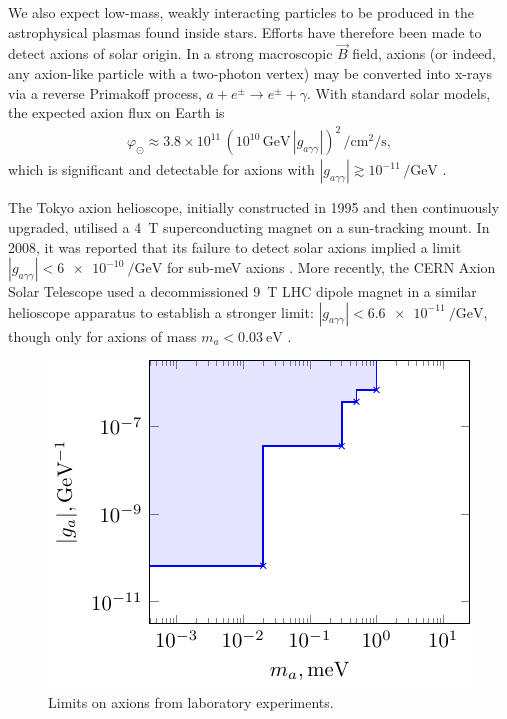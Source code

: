 We also expect low-mass, weakly interacting particles to be produced in the astrophysical plasmas found inside stars.
Efforts have therefore been made to detect axions of solar origin.
In a strong macroscopic $\vec B$ field, axions (or indeed, any axion-like particle with a two-photon vertex) may be converted into x-rays via a reverse Primakoff process, $a + e^\pm \to e^\pm + γ$.
With standard solar models, the expected axion flux on Earth is
\begin{align}
	φ_\odot \approx 3.8\times10^{11}\,(10^{10}\,\si{\giga\eV}\,|g_{aγγ}|)^2\,\si{\per\square\cm\per\s}
,\end{align}
which is significant and detectable for axions with $|g_{aγγ}| \gtrsim 10^{-11}\,\si{\per\giga\eV}$ \cite{solar-axion-flux_2007}.

The Tokyo axion helioscope, initially constructed in 1995 and then continuously upgraded, utilised a \SI{4}{\tesla} superconducting magnet on a sun-tracking mount.
In 2008, it was reported that its failure to detect solar axions implied a limit $|g_{aγγ}| < \SI{6e-10}{\per\giga\eV}$ for sub-\si{\milli\eV} axions \cite{Tokyo-axion-helioscope_2008}.
More recently, the CERN Axion Solar Telescope used a decommissioned \SI{9}{\tesla} LHC dipole magnet in a similar helioscope apparatus to establish a stronger limit: $|g_{aγγ}| < \SI{6.6e-11}{\per\giga\eV}$, though only for axions of mass $m_a < \SI{0.03}{\eV}$ \cite{CAST-helioscope_2017}.


\begin{figure}
	\centering
	\includegraphics{diagrams/lab-bounds.pdf}
	\caption{Limits on axions from laboratory experiments.}
\end{figure}